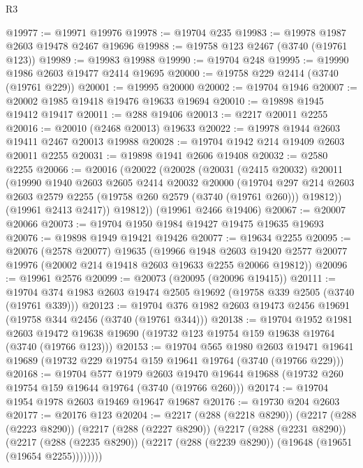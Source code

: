\begin{lexlean}{R3}
\begin{coremodule}
@19977 := @19971 @19976
@19978 := @19704 @235
@19983 := @19978 @1987 @2603 @19478 @2467 @19696
@19988 := @19758 @123 @2467 (@3740 (@19761 @123))
@19989 := @19983 @19988
@19990 := @19704 @248
@19995 := @19990 @1986 @2603 @19477 @2414 @19695
@20000 := @19758 @229 @2414 (@3740 (@19761 @229))
@20001 := @19995 @20000
@20002 := @19704 @1946
@20007 := @20002 @1985 @19418 @19476 @19633 @19694
@20010 := @19898 @1945 @19412 @19417
@20011 := @288 @19406
@20013 := @2217 @20011 @2255
@20016 := @20010 (@2468 @20013) @19633
@20022 := @19978 @1944 @2603 @19411 @2467 @20013 @19988
@20028 := @19704 @1942 @214 @19409 @2603 @20011 @2255
@20031 := @19898 @1941 @2606 @19408
@20032 := @2580 @2255
@20066 := @20016
    (@20022
      (@20028
        (@20031
          (@2415 @20032)
          @20011
          (@19990
            @1940
            @2603
            @2605
            @2414
            @20032
            @20000
            (@19704
              @297
              @214
              @2603
              @2603
              @2579
              @2255
              (@19758 @260 @2579 (@3740 (@19761 @260)))
              @19812))
          (@19961 @2413 @2417))
        @19812))
    (@19961 @2466 @19406)
@20067 := @20007 @20066
@20073 := @19704 @1950 @1984 @19427 @19475 @19635 @19693
@20076 := @19898 @1949 @19421 @19426
@20077 := @19634 @2255
@20095 := @20076
    (@2578 @20077)
    @19635
    (@19966
      @1948
      @2603
      @19420
      @2577
      @20077
      @19976
      (@20002 @214 @19418 @2603 @19633 @2255 @20066 @19812))
@20096 := @19961 @2576
@20099 := @20073 (@20095 (@20096 @19415))
@20111 := @19704 @374 @1983 @2603 @19474 @2505 @19692 (@19758 @339 @2505 (@3740 (@19761 @339)))
@20123 := @19704 @376 @1982 @2603 @19473 @2456 @19691 (@19758 @344 @2456 (@3740 (@19761 @344)))
@20138 := @19704
    @1952
    @1981
    @2603
    @19472
    @19638
    @19690
    (@19732 @123 @19754 @159 @19638 @19764 (@3740 (@19766 @123)))
@20153 := @19704
    @565
    @1980
    @2603
    @19471
    @19641
    @19689
    (@19732 @229 @19754 @159 @19641 @19764 (@3740 (@19766 @229)))
@20168 := @19704
    @577
    @1979
    @2603
    @19470
    @19644
    @19688
    (@19732 @260 @19754 @159 @19644 @19764 (@3740 (@19766 @260)))
@20174 := @19704 @1954 @1978 @2603 @19469 @19647 @19687
@20176 := @19730 @204 @2603
@20177 := @20176 @123
@20204 := @2217
    (@288 (@2218 @8290))
    (@2217
      (@288 (@2223 @8290))
      (@2217
        (@288 (@2227 @8290))
        (@2217
          (@288 (@2231 @8290))
          (@2217
            (@288 (@2235 @8290))
            (@2217 (@288 (@2239 @8290)) (@19648 (@19651 (@19654 @2255))))))))

\end{coremodule}
\end{lexlean}
